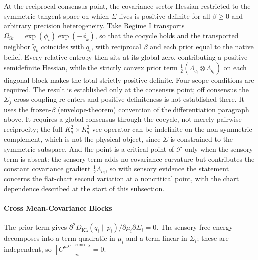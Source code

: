 At the reciprocal-consensus point, the covariance-sector Hessian restricted to the symmetric tangent space on which $\Sigma$ lives is positive definite for all $\beta \geq 0$ and arbitrary precision heterogeneity. Take Regime I transports $\Omega_{ik} = \exp(\phi_i)\exp(-\phi_k)$, so that the cocycle holds and the transported neighbor $\tilde{q}_k$ coincides with $q_i$, with reciprocal $\beta$ and each prior equal to the native belief. Every relative entropy then sits at its global zero, contributing a positive-semidefinite Hessian, while the strictly convex prior term $\frac{1}{2}(\Lambda_{q_i} \otimes \Lambda_{q_i})$ on each diagonal block makes the total strictly positive definite. Four scope conditions are required. The result is established only at the consensus point; off consensus the $\Sigma_j$ cross-coupling re-enters and positive definiteness is not established there. It uses the frozen-$\beta$ (envelope-theorem) convention of the differentiation paragraph above. It requires a global consensus through the cocycle, not merely pairwise reciprocity; the full $K_q^2 \times K_q^2$ vec operator can be indefinite on the non-symmetric complement, which is not the physical object, since $\Sigma$ is constrained to the symmetric subspace. And the point is a critical point of $\mathcal{F}$ only when the sensory term is absent: the sensory term adds no covariance curvature but contributes the constant covariance gradient $\tfrac12\Lambda_{o_i}$, so with sensory evidence the statement concerns the flat-chart second variation at a noncritical point, with the chart dependence described at the start of this subsection.

\paragraph{Cross Mean-Covariance Blocks}

The prior term gives $\partial^2 D_{\mathrm{KL}}(q_i \| p_i)/\partial \mu_i \partial \Sigma_i = 0$. The sensory free energy decomposes into a term quadratic in $\mu_i$ and a term linear in $\Sigma_i$; these are independent, so $[C^{\mu\Sigma}]_{ii}^{\mathrm{sensory}} = 0$.


